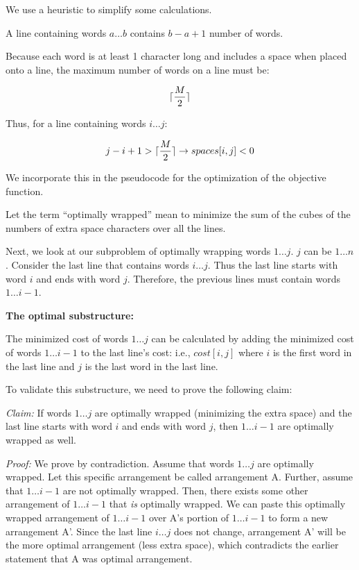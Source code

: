 \documentclass[a4paper]{report}
\DeclarePairedDelimiter{\ceil}{\lceil}{\rceil}
\begin{document}
\begin{enumerate}
      We use a heuristic to simplify some calculations. 

      A line containing words $a\dots b$ contains $b - a + 1$ number of words.
      
      Because each word is at least 1 character long and includes a space
      when placed onto a line, the maximum number of words on a line must be: 
      
      $$\ceil{\frac{M}{2}}$$ 

      Thus, for a line containing words $i \dots j$:

      \begin{align}
        j - i + 1 > \ceil{\frac{M}{2}} \rightarrow spaces[i,j] < 0
      \end{align}

      We incorporate this in the pseudocode for the optimization of the objective function.

      Let the term ``optimally wrapped'' mean to minimize the sum of the cubes of the numbers of extra space characters
      over all the lines. 

      Next, we look at our subproblem of optimally wrapping words $1 \dots j$. 
      $j$ can be $1 \dots n$. Consider the last line that contains words
      $i \dots j$. Thus the last line starts with word $i$ and ends with word $j$. Therefore, the previous lines must contain
      words $1 \dots i-1$.

      {\bf The optimal substructure:}
      
      The minimized cost of words $1\dots j$ can be calculated by adding the minimized cost of words $1\dots i-1$ 
      to the last line's
      cost: i.e., $cost[i,j]$ where $i$ is the first word in the last line and $j$ is the last word in the last line. 

      To validate this substructure, we need to prove the following claim:

      {\it Claim: }  If words $1 \dots j$ are optimally wrapped (minimizing the extra space) and the last line
      starts with word $i$ and ends with word $j$, then $1 \dots i-1$ are optimally wrapped as well. 

      {\it Proof: } We prove by contradiction. Assume that words $1 \dots j$ are optimally wrapped. Let this specific arrangement be
      called arrangement A. Further,
      assume that $1 \dots i-1$ are not optimally wrapped. Then, there exists some other arrangement of $1 \dots i-1$ that
      {\it is} optimally wrapped. We can paste this optimally wrapped arrangement of $1 \dots i-1$ over A's portion of
      $1 \dots i-1$ to form a new arrangement A'. Since
      the last line $i \dots j$ does not change, arrangement A' will be the more optimal arrangement (less extra space), 
      which contradicts the earlier statement that A was optimal arrangement. 


\end{enumerate}
\end{document}
